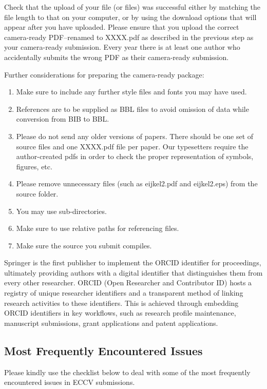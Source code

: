 \documentclass[runningheads]{llncs}
\begin{document}
Check that the upload of your file (or files) was successful either by matching the file length to that on your computer, or by using the download options that will appear after you have uploaded. Please ensure that you upload the correct camera-ready PDF–renamed to XXXX.pdf as described in the previous step as your camera-ready submission. Every year there is at least one author who accidentally submits the wrong PDF as their camera-ready submission.

Further considerations for preparing the camera-ready package:
  \begin{enumerate}
    \item Make sure to include any further style files and fonts you may have used.
    \item References are to be supplied as BBL files to avoid omission of data while conversion from BIB to BBL.
    \item Please do not send any older versions of papers. There should be one set of source files and one XXXX.pdf file per paper. Our typesetters require the author-created pdfs in order to check the proper representation of symbols, figures, etc.
    \item  Please remove unnecessary files (such as eijkel2.pdf and eijkel2.eps) from the source folder. 
    \item  You may use sub-directories.
    \item  Make sure to use relative paths for referencing files.
    \item  Make sure the source you submit compiles.
\end{enumerate}

Springer is the first publisher to implement the ORCID identifier for proceedings, ultimately providing authors with a digital identifier that distinguishes them from every other researcher. ORCID (Open Researcher and Contributor ID) hosts a registry of unique researcher identifiers and a transparent method of linking research activities to these identifiers. This is achieved through embedding ORCID identifiers in key workflows, such as research profile maintenance, manuscript submissions, grant applications and patent applications.
\subsection{Most Frequently Encountered Issues}
Please kindly use the checklist below to deal with some of the most frequently encountered issues in ECCV submissions.
\end{document}
